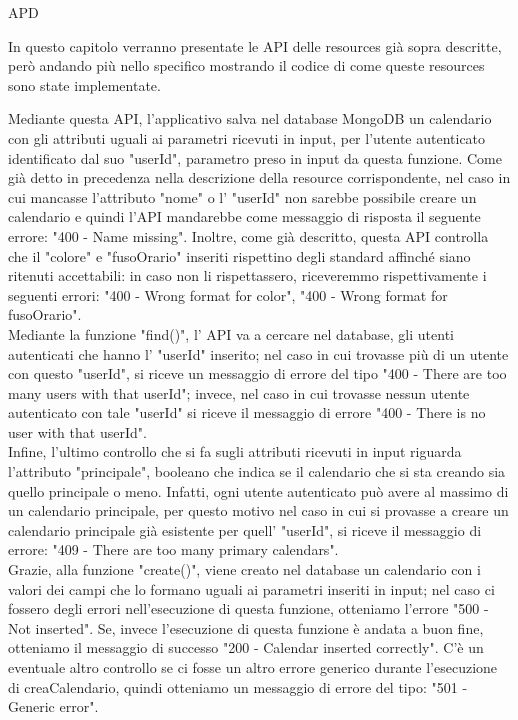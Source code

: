 \begin{listaPersonale} {APD}
\begin{listaPersonale2}[APD]{}
\begin{listaPersonale3}[APD]{}
\begin{center}
            \end{center}
        \end{listaPersonale3}
    \end{listaPersonale2}
    In questo capitolo verranno presentate le API delle resources già sopra descritte, però andando più nello specifico mostrando il codice di come queste resources sono state implementate.
    \begin{listaPersonale2}[APD]{}
                Mediante questa API, l'applicativo salva nel database MongoDB un calendario con gli attributi uguali ai parametri ricevuti in input, per l'utente autenticato identificato dal suo "userId", parametro preso in input da questa funzione.
                Come già detto in precedenza nella descrizione della resource corrispondente, nel caso in cui mancasse l'attributo "nome" o l' "userId" non sarebbe possibile creare un calendario e quindi l'API mandarebbe come messaggio di risposta il seguente errore: "400 - Name missing". Inoltre, come già descritto, questa API controlla che il "colore" e "fusoOrario" inseriti rispettino degli standard affinché siano ritenuti accettabili: in caso non li rispettassero, riceveremmo rispettivamente i seguenti errori: "400 - Wrong format for color", "400 - Wrong format for fusoOrario". \\
                Mediante la funzione "find()", l' API va a cercare nel database, gli utenti autenticati che hanno l' "userId" inserito; nel caso in cui trovasse più di un utente con questo "userId", si riceve un messaggio di errore del tipo "400 - There are too many users with that userId"; invece, nel caso in cui trovasse nessun utente autenticato con tale "userId" si riceve il messaggio di errore "400 - There is no user with that userId". \\
                Infine, l'ultimo controllo che si fa sugli attributi ricevuti in input riguarda l'attributo "principale", booleano che indica se il calendario che si sta creando sia quello principale o meno. Infatti, ogni utente autenticato può avere al massimo di un calendario principale, per questo motivo nel caso in cui si provasse a creare un calendario principale già esistente per quell' "userId", si riceve il messaggio di errore: "409 - There are too many primary calendars". \\
                Grazie, alla funzione "create()", viene creato nel database un calendario con i valori dei campi che lo formano uguali ai parametri inseriti in input; nel caso ci fossero degli errori nell'esecuzione di questa funzione, otteniamo l'errore "500 - Not inserted". Se, invece l'esecuzione di questa funzione è andata a buon fine, otteniamo il messaggio di successo "200 - Calendar inserted correctly". C'è un eventuale altro controllo se ci fosse un altro errore generico durante l'esecuzione di creaCalendario, quindi otteniamo un messaggio di errore del tipo: "501 - Generic error".

\end{listaPersonale2}
\end{listaPersonale}
